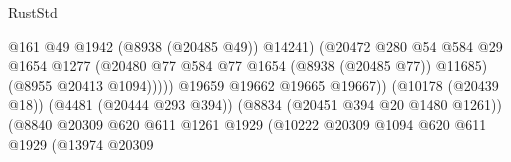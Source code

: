 \begin{lexlean}{RustStd}
\begin{coremodule}
                                                            @161
                                                            @49
                                                            @1942
                                                            (@8938 (@20485 @49))
                                                            @14241)
                                                          (@20472
                                                            @280
                                                            @54
                                                            @584
                                                            @29
                                                            @1654
                                                            @1277
                                                            (@20480
                                                              @77
                                                              @584
                                                              @77
                                                              @1654
                                                              (@8938 (@20485 @77))
                                                              @11685)
                                                            (@8955 @20413 @1094)))))
                                                    @19659
                                                    @19662
                                                    @19665
                                                    @19667))
                                                (@10178 (@20439 @18))
                                                (@4481 (@20444 @293 @394))
                                                (@8834 (@20451 @394 @20 @1480 @1261))
                                                (@8840
                                                  @20309
                                                  @620
                                                  @611
                                                  @1261
                                                  @1929
                                                  (@10222
                                                    @20309
                                                    @1094
                                                    @620
                                                    @611
                                                    @1929
                                                    (@13974
                                                      @20309

\end{coremodule}
\end{lexlean}
